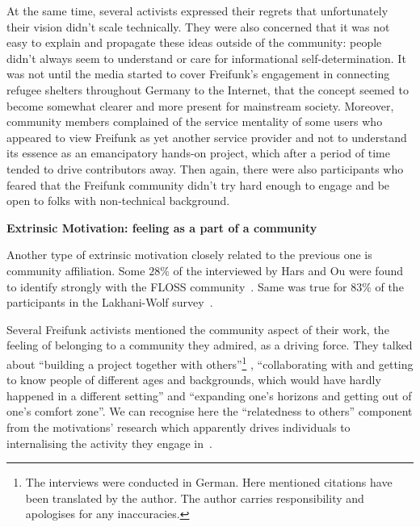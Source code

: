 At the same time, several activists expressed their regrets that unfortunately their vision didn't scale technically.
They were also concerned that it was not easy to explain and propagate these ideas outside of the community: people didn't always seem to understand or care for informational self-determination.
It was not until the media started to cover Freifunk's engagement in connecting refugee shelters throughout Germany to the Internet, that the concept seemed to become somewhat clearer and more present for mainstream society.
Moreover, community members complained of the service mentality of some users who appeared to view Freifunk as yet another service provider and not to understand its essence as an emancipatory hands-on project, which after a period of time tended to drive contributors away.
Then again, there were also participants who feared that the Freifunk community didn't try hard enough to engage and be open to folks with non-technical background.

\begin{comment}
Although net neutrality is one of the key principles in the Pico-Peering-Agreement, the minimal consensus paper/document(?) for all Freifunk communities/free network projects, not all of the survey participants interpreted the notion the same way, nor did they grant it equal importance.
\end{comment}


\textbf{Extrinsic Motivation: feeling as a part of a community}

Another type of extrinsic motivation closely related to the previous one is community affiliation.
Some $28\%$ of the interviewed by Hars and Ou were found to identify strongly with the FLOSS community~\cite{HarOu2002}.
Same was true for $83\%$ of the participants in the Lakhani-Wolf survey~\cite{LakWo2005}.

Several Freifunk activists mentioned the community aspect of their work, the feeling of belonging to a community they admired, as a driving force.
They talked about ``building a project together with others''\footnote{The interviews were conducted in German. Here mentioned citations have been translated by the author. The author carries responsibility and apologises for any inaccuracies.}
, ``collaborating with and getting to know people of different ages and backgrounds, which would have hardly happened in a different setting'' and ``expanding one's horizons and getting out of one's comfort zone''.
We can recognise here the ``relatedness to others'' component from the motivations' research which apparently drives individuals to internalising the activity they engage in~\cite{RyDe2000}.


